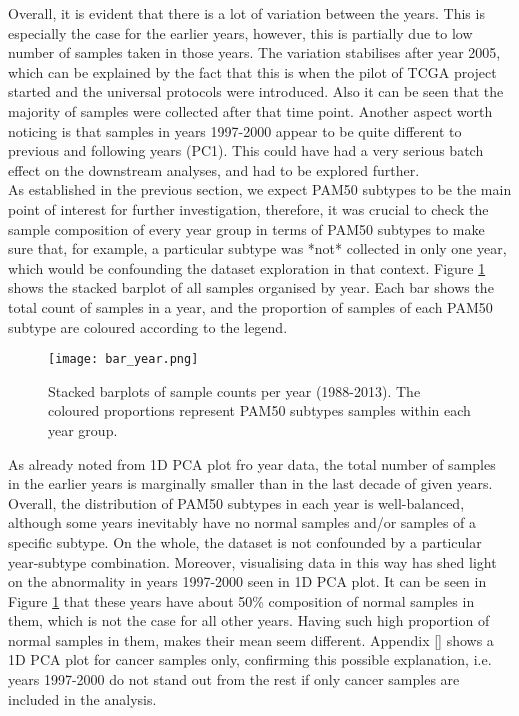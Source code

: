     
    Overall, it is evident that there is a lot of variation between the years. This is especially the case for the earlier years, however, this is partially due to low number of samples taken in those years.  The variation stabilises after year 2005, which can be explained by the fact that this is when the pilot of TCGA project started and the universal protocols were introduced. Also it can be seen that the majority of samples were collected after that time point. Another aspect worth noticing is that samples in years 1997-2000 appear to be quite different to previous and following years (PC1). This could have had a very serious batch effect on the downstream analyses, and had to be explored further.\\
    
    As established in the previous section, we expect PAM50 subtypes to be the main point of interest for further investigation, therefore, it was crucial to check the sample composition of every year group in terms of PAM50 subtypes to make sure that, for example, a particular subtype was *not*  collected in only one year, which would be confounding the dataset exploration in that context. Figure \ref{fig:baryear} shows the stacked barplot of all samples organised by year.  Each bar shows the total count of samples in a year, and the proportion of samples of each PAM50 subtype are coloured according to the legend. 
    
    
            \begin{figure}[!h]
            \centering
            \texttt{[image: bar\_year.png]}
            \caption{Stacked barplots of sample counts per year (1988-2013). The coloured proportions represent PAM50 subtypes samples within each year group. }
            \label{fig:baryear}
            \end{figure}
    
    As already noted from 1D PCA plot fro year data, the total number of samples in the earlier years is marginally smaller than in the last decade of given years. Overall, the distribution of PAM50 subtypes in each year is well-balanced,  although some years inevitably have no normal samples and/or samples of a specific subtype. On the whole, the dataset is not confounded by a particular year-subtype combination.  Moreover, visualising data in this way has shed light on the abnormality in years 1997-2000 seen in 1D PCA plot. It can be seen in Figure \ref{fig:baryear} that these years have about 50\% composition of normal samples in them, which is not the case for all other years. Having such high proportion of normal samples in them, makes their mean seem different. Appendix \ref{} shows a 1D PCA plot for cancer samples only, confirming this possible explanation, i.e. years 1997-2000 do not stand out from the rest if only cancer samples are included in the analysis. \\
    
